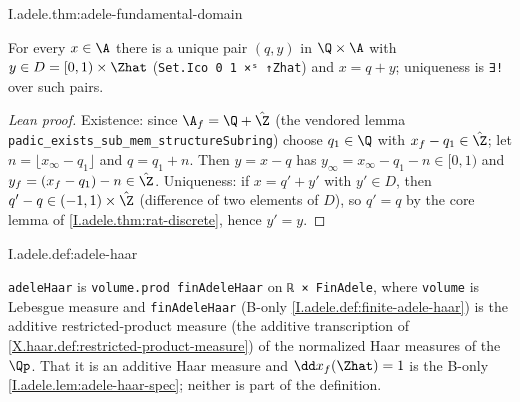 \begin{theorem}
\end{theorem}
\begin{tfformal}{I.adele.thm:adele-fundamental-domain}
\begin{tffidelity}
For every $x\in\A$ there is a unique pair $(q,y)$ in $\Q\times\A$ with $y\in D=[0,1)\times\Zhat$ (\texttt{Set.Ico 0 1 ×ˢ ↑Zhat}) and $x=q+y$; uniqueness is \texttt{∃!} over such pairs.
\end{tffidelity}
\end{tfformal}
\begin{proof}[Lean proof]
Existence: since $\A_f=\Q+\hat\Z$ (the vendored lemma \texttt{padic\_exists\_sub\_mem\_structureSubring}) choose $q_1\in\Q$ with $x_f-q_1\in\hat\Z$; let $n=\lfloor x_\infty-q_1\rfloor$ and $q=q_1+n$. Then $y=x-q$ has $y_\infty=x_\infty-q_1-n\in[0,1)$ and $y_f=(x_f-q_1)-n\in\hat\Z$. Uniqueness: if $x=q'+y'$ with $y'\in D$, then $q'-q\in(-1,1)\times\hat\Z$ (difference of two elements of $D$), so $q'=q$ by the core lemma of \cref{I.adele.thm:rat-discrete}, hence $y'=y$.
\end{proof}

\begin{definition}
\end{definition}
\begin{tfformal}{I.adele.def:adele-haar}
\begin{tffidelity}
\texttt{adeleHaar} is \texttt{volume.prod finAdeleHaar} on \texttt{ℝ × FinAdele}, where \texttt{volume} is Lebesgue measure and \texttt{finAdeleHaar} (B-only \cref{I.adele.def:finite-adele-haar}) is the additive restricted-product measure (the additive transcription of \cref{X.haar.def:restricted-product-measure}) of the normalized Haar measures of the $\Qp$. That it is an additive Haar measure and $\dd x_f(\Zhat)=1$ is the B-only \cref{I.adele.lem:adele-haar-spec}; neither is part of the definition.
\end{tffidelity}
\end{tfformal}

